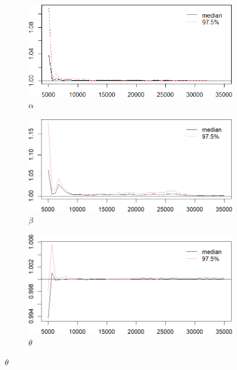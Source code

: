 \documentclass{Class/julia}
\begin{document}
\begin{figure}[!ht]
    \centering
    \caption{PSRF Values (Gelman--Rubin Diagnostic) (\texttt{itamtplcost})}
    \label{fig:11}
    \begin{subfigure}{0.45\textwidth}
        \centering
        \includegraphics[width=\textwidth]{itamtplcost/gelman_alpha.png}
        \caption{\( \alpha \)}
    \end{subfigure}
    \hfill
    \begin{subfigure}{0.45\textwidth}
        \centering
        \includegraphics[width=\textwidth]{itamtplcost/gelman_beta.png}
        \caption{\( \beta \)}
    \end{subfigure}

    \vspace{1em}

    \begin{subfigure}{0.45\textwidth}
        \centering
        \includegraphics[width=\textwidth]{itamtplcost/gelman_theta.png}
        \caption{\( \theta \)}
    \end{subfigure}
\end{figure}
\end{document}
